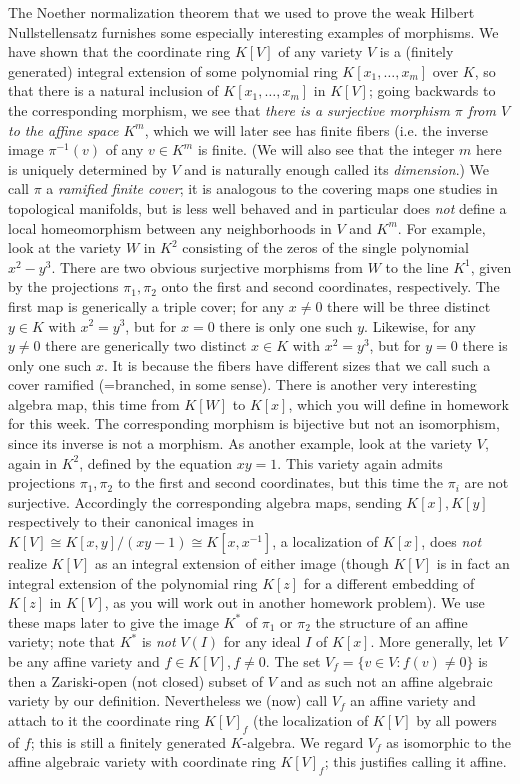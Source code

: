 \documentclass[10pt]{article}
\begin{document}
The Noether normalization theorem that we used to prove the weak Hilbert
Nullstellensatz furnishes some especially interesting examples of
morphisms. We have shown that the coordinate ring $K[V]$ of any variety
$V$ is a (finitely generated) integral extension of some polynomial ring
$K[x_1,\ldots,x_m]$ over $K$, so that there is a natural inclusion of
$K[x_1,\ldots,x_m]$ in $K[V]$; going backwards to the corresponding
morphism, we see that {\sl there is a surjective morphism $\pi$ from $V$
  to the affine space $K^m$}, which we will later see has finite fibers
(i.e. the inverse image $\pi^{-1}(v)$ of any $v\in K^m$ is finite. (We
will also see that the integer $m$ here is uniquely determined by $V$
and is naturally enough called its {\sl dimension}.) We call $\pi$ a
{\sl ramified finite cover}; it is analogous to the covering maps one
studies in topological manifolds, but is less well behaved and in
particular does {\sl not} define a local homeomorphism between any
neighborhoods in $V$ and $K^m$. For example, look at the variety $W$ in
$K^2$ consisting of the zeros of the single polynomial $x^2 - y^3$.
There are two obvious surjective morphisms from $W$ to the line $K^1$,
given by the projections $\pi_1,\pi_2$ onto the first and second
coordinates, respectively. The first map is generically a triple cover;
for any $x\ne 0$ there will be three distinct $y\in K$ with $x^2 = y^3$,
but for $x=0$ there is only one such $y$. Likewise, for any $y\ne0$
there are generically two distinct $x\in K$ with $x^2 = y^3$, but for
$y=0$ there is only one such $x$. It is because the fibers have
different sizes that we call such a cover ramified (=branched, in some
sense). There is another very interesting algebra map, this time from
$K[W]$ to $K[x]$, which you will define in homework for this week. The
corresponding morphism is bijective but not an isomorphism, since its
inverse is not a morphism. As another example, look at the variety $V$,
again in $K^2$, defined by the equation $xy = 1$. This variety again
admits projections $\pi_1,\pi_2$ to the first and second coordinates,
but this time the $\pi_i$ are not surjective. Accordingly the
corresponding algebra maps, sending $K[x],K[y]$ respectively to their
canonical images in $K[V]\cong K[x,y]/(xy - 1)\cong K[x,x^{-1}]$, a
localization of $K[x]$, does {\sl not} realize $K[V]$ as an integral
extension of either image (though $K[V]$ is in fact an integral
extension of the polynomial ring $K[z]$ for a different embedding of
$K[z]$ in $K[V]$, as you will work out in another homework problem). We
use these maps later to give the image $K^*$ of $\pi_1$ or $\pi_2$ the
structure of an affine variety; note that $K^*$ is {\sl not} $V(I)$ for
any ideal $I$ of $K[x]$. More generally, let $V$ be any affine variety
and $f\in K[V],f\ne0$. The set $V_f = \{v\in V: f(v)\ne0\}$ is then a
Zariski-open (not closed) subset of $V$ and as such not an affine
algebraic variety by our definition. Nevertheless we (now) call $V_f$ an
affine variety and attach to it the coordinate ring $K[V]_f$ (the
localization of $K[V]$ by all powers of $f$; this is still a finitely
generated $K$-algebra. We regard $V_f$ as isomorphic to the affine
algebraic variety with coordinate ring $K[V]_f$; this justifies calling
it affine.
\end{document}
